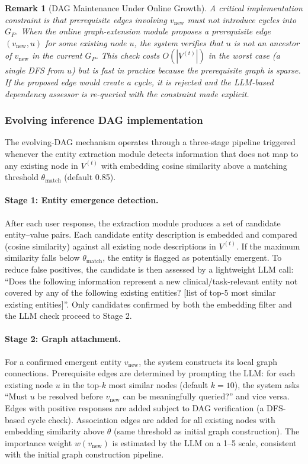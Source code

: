 \documentclass[11pt,a4paper]{article}
\newtheorem{remark}{Remark}
\begin{document}
\begin{remark}[DAG Maintenance Under Online Growth]
\label{rem:dag_maintenance}
A critical implementation constraint is that prerequisite edges involving
$v_{\mathrm{new}}$ must not introduce cycles into $G_P$. When the online
graph-extension module proposes a prerequisite edge
$(v_{\mathrm{new}}, u)$ for some existing node $u$, the system verifies
that $u$ is not an ancestor of $v_{\mathrm{new}}$ in the current $G_P$.
This check costs $O(|V^{(t)}|)$ in the worst case (a single DFS from $u$)
but is fast in practice because the prerequisite graph is sparse. If the
proposed edge would create a cycle, it is rejected and the LLM-based
dependency assessor is re-queried with the constraint made explicit.
\end{remark}


\subsubsection{Evolving inference DAG implementation}
\label{sec:methods_evolving}

The evolving-DAG mechanism operates through a three-stage pipeline triggered
whenever the entity extraction module detects information that does not map
to any existing node in $V^{(t)}$ with embedding cosine similarity above a
matching threshold $\theta_{\mathrm{match}}$ (default 0.85).

\paragraph{Stage 1: Entity emergence detection.}
After each user response, the extraction module produces a set of candidate
entity--value pairs. Each candidate entity description is embedded and
compared (cosine similarity) against all existing node descriptions in
$V^{(t)}$. If the maximum similarity falls below $\theta_{\mathrm{match}}$,
the entity is flagged as potentially emergent. To reduce false positives,
the candidate is then assessed by a lightweight LLM call: ``Does the
following information represent a new clinical/task-relevant entity not
covered by any of the following existing entities? [list of top-5 most
similar existing entities]''. Only candidates confirmed by both the
embedding filter and the LLM check proceed to Stage 2.

\paragraph{Stage 2: Graph attachment.}
For a confirmed emergent entity $v_{\mathrm{new}}$, the system constructs
its local graph connections. Prerequisite edges are determined by prompting
the LLM: for each existing node $u$ in the top-$k$ most similar nodes
(default $k = 10$), the system asks ``Must $u$ be resolved before
$v_{\mathrm{new}}$ can be meaningfully queried?'' and vice versa. Edges
with positive responses are added subject to DAG verification (a DFS-based
cycle check). Association edges are added for all existing nodes with
embedding similarity above $\theta$ (same threshold as initial graph
construction). The importance weight $w(v_{\mathrm{new}})$ is estimated
by the LLM on a 1--5 scale, consistent with the initial graph construction
pipeline.
\end{document}
